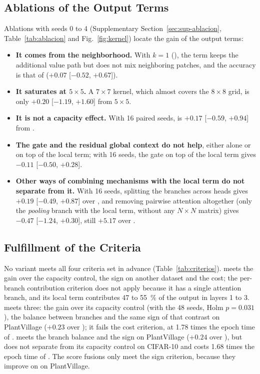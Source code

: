 

\subsection{Ablations of the Output Terms}
\label{sec:res-ablacion}
Ablations with seeds 0 to 4 (Supplementary Section~\ref{sec:sup-ablacion}, Table~\ref{tab:ablacion} and Fig.~\ref{fig:kernel}) locate the gain of the output terms:
\begin{itemize}
  \item \textbf{It comes from the neighborhood.} With $k=1$ (), the term keeps the additional value path but does not mix neighboring patches, and the accuracy is that of  ($+0.07$ [$-0.52$, $+0.67$]).
  \item \textbf{It saturates at $5\times5$.} A $7\times7$ kernel, which almost covers the $8\times8$ grid, is only $+0.20$ [$-1.19$, $+1.60$] from $5\times5$.
  \item \textbf{It is not a capacity effect.} With 16 paired seeds,  is $+0.17$ [$-0.59$, $+0.94$] from .
  \item \textbf{The gate and the residual global context do not help}, either alone or on top of the local term; with 16 seeds, the gate on top of the local term gives $-0.11$ [$-0.50$, $+0.28$].
  \item \textbf{Other ways of combining mechanisms with the local term do not separate from it.} With 16 seeds, splitting the branches across heads gives $+0.19$ [$-0.49$, $+0.87$] over , and removing pairwise attention altogether (only the \emph{pooling} branch with the local term, without any $N\times N$ matrix) gives $-0.47$ [$-1.24$, $+0.30$], still $+5.17$ over .
\end{itemize}

\subsection{Fulfillment of the Criteria}
\label{sec:res-criterios}
No variant meets all four criteria set in advance (Table~\ref{tab:criterios}).  meets the gain over the capacity control, the sign on another dataset and the cost; the per-branch contribution criterion does not apply because it has a single attention branch, and its local term contributes 47 to 55~\% of the output in layers 1 to 3.  meets three: the gain over its capacity control (with the 48 seeds, Holm $p=0.031$), the balance between branches and the same sign of that contrast on PlantVillage ($+0.23$ over ); it fails the cost criterion, at 1.78 times the epoch time of .  meets the branch balance and the sign on PlantVillage ($+0.24$ over ), but does not separate from its capacity control on CIFAR-10 and costs 1.68 times the epoch time of . The score fusions only meet the sign criterion, because they improve on  on PlantVillage.


